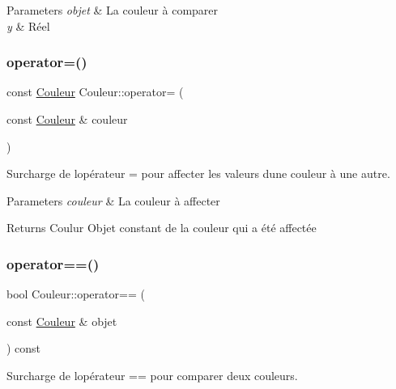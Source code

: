 \begin{DoxyParams}{Parameters}
{\em objet} & La couleur à comparer \\
\hline
{\em y} & Réel \\
\hline
\end{DoxyParams}
\mbox{\label{class_couleur_af49bf608ba98af5f9dfe19fbe2759000}} 
\subsubsection{\texorpdfstring{operator=()}{operator=()}}
{\footnotesize\ttfamily const \hyperlink{class_couleur}{Couleur} Couleur\+::operator= (\begin{DoxyParamCaption}\item[{const \hyperlink{class_couleur}{Couleur} \&}]{couleur }\end{DoxyParamCaption})}



Surcharge de l\textquotesingle{}opérateur = pour affecter les valeurs d\textquotesingle{}une couleur à une autre. 


\begin{DoxyParams}{Parameters}
{\em couleur} & La couleur à affecter \\
\hline
\end{DoxyParams}
\begin{DoxyReturn}{Returns}
Coulur Objet constant de la couleur qui a été affectée 
\end{DoxyReturn}
\mbox{\label{class_couleur_a159c6c550e8855d6a44765ab5e0b0de8}} 
\subsubsection{\texorpdfstring{operator==()}{operator==()}}
{\footnotesize\ttfamily bool Couleur\+::operator== (\begin{DoxyParamCaption}\item[{const \hyperlink{class_couleur}{Couleur} \&}]{objet }\end{DoxyParamCaption}) const}



Surcharge de l\textquotesingle{}opérateur == pour comparer deux couleurs. 



